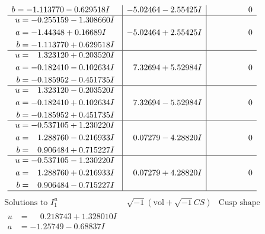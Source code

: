 \documentclass[1p]{elsarticle_modified}
\theoremstyle{definition}
\newcommand{\I}{\sqrt{-1}}
\begin{document}
$$\begin{array}{c|c|c}
\begin{aligned}
b &= -1.113770 - 0.629518 I\end{aligned}
 & -5.02464 - 2.55425 I & \phantom{-0.000000 } 0 \\ \hline\begin{aligned}
u &= -0.255159 - 1.308660 I \\
a &= -1.44348 + 0.16689 I \\
b &= -1.113770 + 0.629518 I\end{aligned}
 & -5.02464 + 2.55425 I & \phantom{-0.000000 } 0 \\ \hline\begin{aligned}
u &= \phantom{-}1.323120 + 0.203520 I \\
a &= -0.182410 - 0.102634 I \\
b &= -0.185952 - 0.451735 I\end{aligned}
 & \phantom{-}7.32694 + 5.52984 I & \phantom{-0.000000 } 0 \\ \hline\begin{aligned}
u &= \phantom{-}1.323120 - 0.203520 I \\
a &= -0.182410 + 0.102634 I \\
b &= -0.185952 + 0.451735 I\end{aligned}
 & \phantom{-}7.32694 - 5.52984 I & \phantom{-0.000000 } 0 \\ \hline\begin{aligned}
u &= -0.537105 + 1.230220 I \\
a &= \phantom{-}1.288760 - 0.216933 I \\
b &= \phantom{-}0.906484 + 0.715227 I\end{aligned}
 & \phantom{-}0.07279 - 4.28820 I & \phantom{-0.000000 } 0 \\ \hline\begin{aligned}
u &= -0.537105 - 1.230220 I \\
a &= \phantom{-}1.288760 + 0.216933 I \\
b &= \phantom{-}0.906484 - 0.715227 I\end{aligned}
 & \phantom{-}0.07279 + 4.28820 I & \phantom{-0.000000 } 0\\
 \hline 
 \end{array}$$\newpage$$\begin{array}{c|c|c}  
\text{Solutions to }I^u_{1}& \I (\text{vol} + \sqrt{-1}CS) & \text{Cusp shape}\\
 \hline 
\begin{aligned}
u &= \phantom{-}0.218743 + 1.328010 I \\
a &= -1.25749 - 0.68837 I \\

\end{aligned}
\end{array}$$
\end{document}
